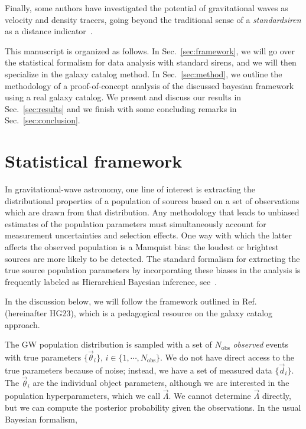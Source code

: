 \documentclass[%
preprint,
nofootinbib,
 amsmath,amssymb,
 aps,
]{revtex4-2}
\newcommand{\nobs}[0]{N_{\text{obs}}}
\begin{document}
Finally, some authors have investigated the potential of gravitational waves as velocity and
density tracers, going beyond the traditional sense of a \textit{standardsiren} as a distance
indicator~\cite{Palmese_2021,Alfradique:2022tox}.

This manuscript is organized as follows. In Sec.~\ref{sec:framework}, we will go over the
statistical formalism for data analysis with standard sirens, and we will then specialize in the
galaxy catalog method. In Sec.~\ref{sec:method}, we outline the methodology of a proof-of-concept
analysis of the discussed bayesian framework using a real galaxy catalog. We present and discuss
our results in Sec.~\ref{sec:results} and we finish with some concluding remarks in
Sec.~\ref{sec:conclusion}.

\section{\label{sec:framework}Statistical framework}

In gravitational-wave astronomy, one line of interest is extracting the distributional properties
of a population of sources based on a set of observations which are drawn from that distribution.
Any methodology that leads to unbiased estimates of the population parameters must simultaneously
account for measurement uncertainties and selection effects. One way with which the latter affects
the observed population is a Mamquist bias: the loudest or brightest sources are more likely to be
detected. The standard formalism for extracting the true source population parameters by
incorporating these biases in the analysis is frequently labeled as Hierarchical Bayesian
inference, see~\cite{Loredo:2004nn,Mandel:2018mve,Vitale_2021}.

In the discussion below, we will follow the framework outlined in Ref.~
(hereinafter HG23), which is a pedagogical resource on the galaxy catalog approach.

The GW population distribution is sampled with a set of $\nobs$ \textit{observed} events with true
parameters $\{ \vec{\theta}_i \}$, $i \in \{1, \cdots, \nobs\}$. We do not have direct access to
the true parameters because of noise; instead, we have a set of measured data $\{ \vec{d}_i \}$.
The $\vec{\theta}_i$ are the individual object parameters, although we are interested in the
population hyperparameters, which we call $\vec{\Lambda}$. We cannot determine $\vec{\Lambda}$
directly, but we can compute the posterior probability given the observations. In the usual
Bayesian formalism,
\end{document}
